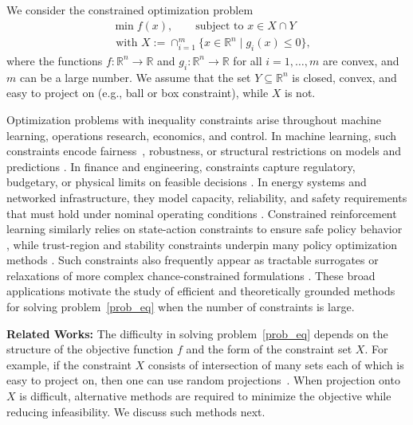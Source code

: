 \documentclass{article}
\def\rn{\mathbb{R}^n}
\theoremstyle{plain}
\theoremstyle{definition}
\theoremstyle{remark}
\begin{document}
We consider the constrained optimization problem
\begin{align}
    &\min f(x), \qquad \text{subject to } x \in X\cap Y \nonumber\\
    &\text{ with } X := \cap_{i =1}^m \{ x \in\rn\mid g_i(x) \leq 0 \}, \label{prob_eq}\tag{P} 
\end{align}
where the functions $f:\mathbb{R}^n\to \mathbb{R}$ and $g_i:\mathbb{R}^n\to\mathbb{R}$ for all $i =1, \ldots, m$ are convex, and $m$ can be a large number. We assume that the set $Y\subseteq\rn$ is closed, convex, and easy to project on (e.g., ball or box constraint), while $X$ is not.


Optimization problems with inequality constraints arise throughout machine learning, operations research, economics, and control. In machine learning, such constraints encode fairness~\cite{zafar2017fairness}, robustness, or structural restrictions on models and predictions \cite{cotter2019optimization}. In finance and engineering, constraints capture regulatory, budgetary, or physical limits on feasible decisions \cite{rockafellar2000optimization, krokhmal2002portfolio}. In energy systems and networked infrastructure, they model capacity, reliability, and safety requirements that must hold under nominal operating conditions \cite{zampara2025capacity, da2020reliability}. Constrained reinforcement learning similarly relies on state-action constraints to ensure safe policy behavior \cite{chow2018lyapunov, bai2023achieving}, while trust-region and stability constraints underpin many policy optimization methods \cite{schulman2015trust, achiam2017constrained}. Such constraints also frequently appear as tractable surrogates or relaxations of more complex chance-constrained formulations \cite{ahmed2014convex, nemirovski2007convex, zhang2023global}. These broad applications motivate the study of efficient and theoretically grounded methods for solving problem~\eqref{prob_eq} when the number of constraints is large.


\noindent \textbf{Related Works:}
The difficulty in solving problem~\eqref{prob_eq} depends on the structure of the objective function $f$ and the form of the constraint set $X$. For example, if the constraint $X$ consists of intersection of many sets each of which is easy to project on, then one can use random projections~\cite{wang2015incremental,wang2016stochastic}. When projection onto $X$ is difficult, alternative methods are required to minimize the objective while reducing infeasibility. We discuss such methods next.
\end{document}

